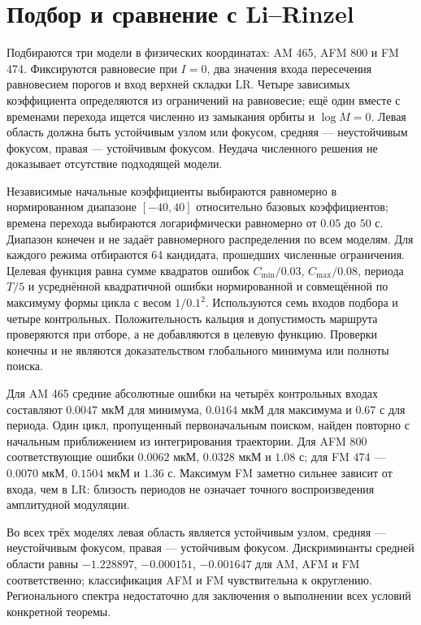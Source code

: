 \section{Подбор и сравнение с Li--Rinzel}
Подбираются три модели в физических координатах: AM 465, AFM 800 и FM 474. Фиксируются равновесие при $I=0$, два значения входа пересечения равновесием порогов и вход верхней складки LR. Четыре зависимых коэффициента определяются из ограничений на равновесие; ещё один вместе с временами перехода ищется численно из замыкания орбиты и $\log M=0$. Левая область должна быть устойчивым узлом или фокусом, средняя --- неустойчивым фокусом, правая --- устойчивым фокусом. Неудача численного решения не доказывает отсутствие подходящей модели.

Независимые начальные коэффициенты выбираются равномерно в нормированном диапазоне $[-40,40]$ относительно базовых коэффициентов; времена перехода выбираются логарифмически равномерно от $0.05$ до $50$ с. Диапазон конечен и не задаёт равномерного распределения по всем моделям. Для каждого режима отбираются 64 кандидата, прошедших численные ограничения. Целевая функция равна сумме квадратов ошибок $C_{\min}/0.03$, $C_{\max}/0.08$, периода $T/5$ и усреднённой квадратичной ошибки нормированной и совмещённой по максимуму формы цикла с весом $1/0.1^2$. Используются семь входов подбора и четыре контрольных. Положительность кальция и допустимость маршрута проверяются при отборе, а не добавляются в целевую функцию. Проверки конечны и не являются доказательством глобального минимума или полноты поиска.

Для AM 465 средние абсолютные ошибки на четырёх контрольных входах составляют $0.0047$ мкМ для минимума, $0.0164$ мкМ для максимума и $0.67$ с для периода. Один цикл, пропущенный первоначальным поиском, найден повторно с начальным приближением из интегрирования траектории. Для AFM 800 соответствующие ошибки $0.0062$ мкМ, $0.0328$ мкМ и $1.08$ с; для FM 474 --- $0.0070$ мкМ, $0.1504$ мкМ и $1.36$ с. Максимум FM заметно сильнее зависит от входа, чем в LR: близость периодов не означает точного воспроизведения амплитудной модуляции.

Во всех трёх моделях левая область является устойчивым узлом, средняя --- неустойчивым фокусом, правая --- устойчивым фокусом. Дискриминанты средней области равны $-1.228897$, $-0.000151$, $-0.001647$ для AM, AFM и FM соответственно; классификация AFM и FM чувствительна к округлению. Регионального спектра недостаточно для заключения о выполнении всех условий конкретной теоремы.

